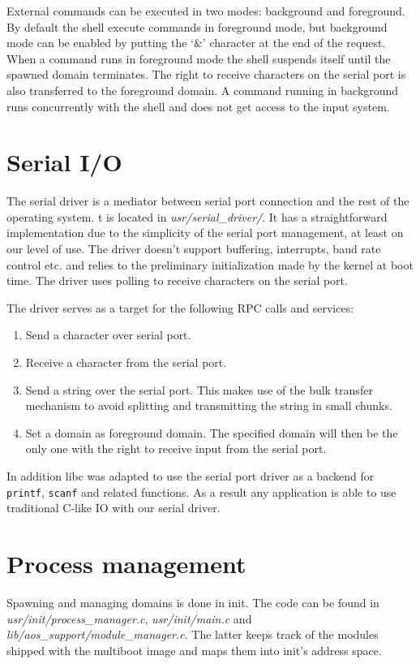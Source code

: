 \documentclass[a4paper,10pt]{article}
\newcommand{\filepath}[1]{\emph{ #1}}
\begin{document}
External commands can be executed in two modes: background and foreground.
By default the shell execute commands in foreground mode, but background mode can be enabled by putting the `\&' character at the end of the request.
When a command runs in foreground mode the shell suspends itself until the spawned domain terminates.
The right to receive characters on the serial port is also transferred to the foreground domain.
A command running in background runs concurrently with the shell and does not get access to the input system.
    	    	
\section{Serial I/O}
The serial driver is a mediator between serial port connection and the rest of the operating system.
t is located in \filepath{usr/serial\_driver/}.
It has a straightforward implementation due to the simplicity of the serial port management, at least on our level of use.
The driver doesn't support buffering, interrupts, baud rate control etc. and relies to the preliminary initialization made by the kernel at boot time.
The driver uses polling to receive characters on the serial port.

The driver serves as a target for the following RPC calls and services:
\begin{enumerate}
	\item Send a character over serial port.
	\item Receive a character from the serial port.
	\item Send a string over the serial port. This makes use of the bulk transfer mechanism to avoid splitting and transmitting the string in small chunks.
	\item Set a domain as foreground domain. The specified domain will then be the only one with the right to receive input from the serial port.
\end{enumerate}

In addition libc was adapted to use the serial port driver as a backend for \lstinline!printf!, \lstinline!scanf! and related functions.
As a result any application is able to use traditional C-like IO with our serial driver.

\section{Process management}
\label{sec:process-management}

Spawning and managing domains is done in init.
The code can be found in \filepath{usr/init/process\_manager.c}, \filepath{usr/init/main.c} and \filepath{lib/aos\_support/module\_manager.c}.
The latter keeps track of the modules shipped with the multiboot image and maps them into init's address space.
\end{document}
